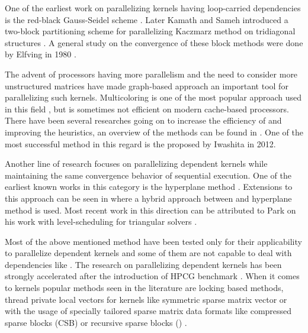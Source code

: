 One of the earliest work on parallelizing kernels having loop-carried dependencies is the red-black Gauss-Seidel scheme \cite{RBGS}. Later Kamath and Sameh introduced a two-block partitioning scheme for parallelizing Kaczmarz method on tridiagonal structures \cite{Kamath}. A general study on the convergence of these block methods were done by Elfving in 1980 \cite{Elfving1980}.

The advent of processors having more parallelism and the need to consider more unstructured matrices have made graph-based approach an important tool for parallelizing such kernels. Multicoloring is one of the most popular approach used in this field \cite{MC}, but is sometimes not efficient on modern cache-based processors. There have been several researches going on to increase the efficiency of \MCfull and improving the heuristics, an overview of the methods can be found in \cite{equitable_color}. One of the most successful method in this regard is the \ABMCfull \cite{ABMC} proposed by Iwashita \etal in 2012. 

Another line of research focuses on parallelizing dependent kernels while maintaining the same convergence behavior of sequential execution. One of the earliest known works in this category is the hyperplane method \cite{saad}. Extensions to this approach can be seen in \cite{cm-rcm} where a hybrid approach between \MCfull and hyperplane method is used. Most recent work in this direction can be attributed to Park \etal on his work with level-scheduling for triangular solvers \cite{park_ls}.

Most of the above mentioned method have been tested only for their applicability to parallelize \DONE dependent kernels and some of them are not capable to deal with dependencies like \DTWO. The research on parallelizing \DONE dependent kernels has been strongly accelerated after the introduction of HPCG benchmark \cite{hpcg}. When it comes to \DTWO kernels popular methods seen in the literature are locking based methods, thread private local vectors \cite{thread_private_symm_spmv} for kernels like symmetric sparse matrix vector or with the usage of specially tailored sparse matrix data formats like compressed sparse blocks (CSB) \cite{CSB} or recursive sparse blocks (\RSB) \cite{RSB}.